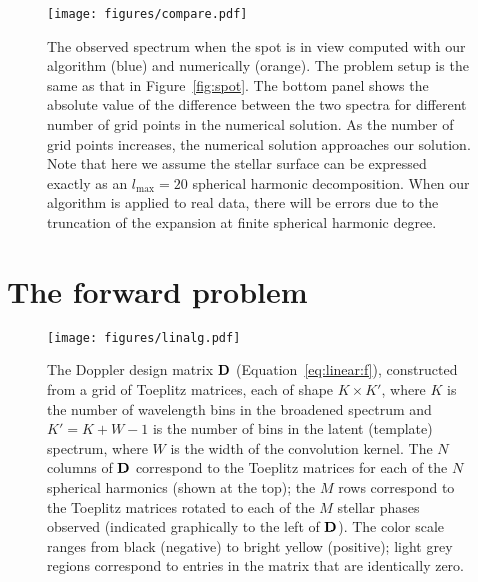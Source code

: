 \documentclass[modern]{aastex631}
\begin{document}
\begin{figure}[t!]
    \begin{centering}
        \texttt{[image: figures/compare.pdf]}
        \caption{%
            The observed spectrum when the spot is in view computed with our algorithm (blue) and numerically (orange). 
            The problem setup is the same as that in Figure~\ref{fig:spot}. 
            The bottom panel shows the absolute value of the difference between the two spectra for different number of grid points in the numerical solution.
            As the number of grid points increases, the numerical solution approaches our solution.
            Note that here we assume the stellar surface can be expressed exactly as an $l_\mathrm{max} = 20$ spherical harmonic decomposition.
            When our algorithm is applied to real data, there will be errors due to the truncation of the expansion at finite spherical harmonic degree.
        }
        \label{fig:compare}
    \end{centering}
\end{figure}

\section{The forward problem}
\label{sec:linear}

\begin{figure}[ht!]
    \begin{centering}
        \texttt{[image: figures/linalg.pdf]}
        \caption{%
            The Doppler design matrix ${\mathbf{D}}$ (Equation~\ref{eq:linear:f}), constructed from a grid of Toeplitz matrices, each of shape $K \times K'$, where $K$ is the number of wavelength bins in the broadened spectrum and $K' = K + W - 1$ is the number of bins in the latent (template) spectrum, where $W$ is the width of the convolution kernel.
            The $N$ columns of ${\mathbf{D}}$ correspond to the Toeplitz matrices for each of the $N$ spherical harmonics (shown at the top);
            the $M$ rows correspond to the Toeplitz matrices rotated to each of the $M$ stellar phases observed (indicated graphically to the left of ${\mathbf{D}}$).
            The color scale ranges from black (negative) to bright yellow (positive); light grey regions correspond to entries in the matrix that are identically zero.
        }
        \label{fig:linalg}
    \end{centering}
\end{figure}
\end{document}
